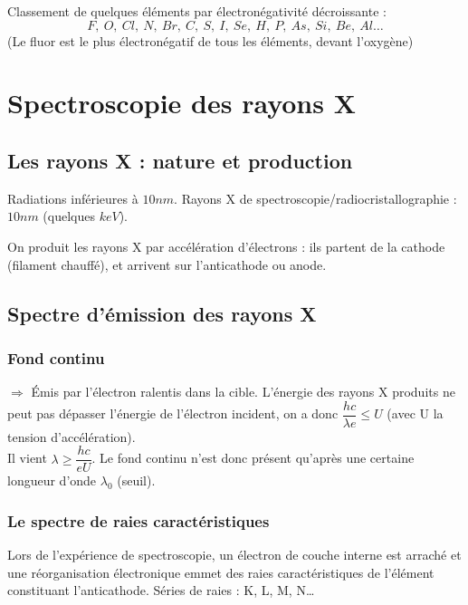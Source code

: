 \documentclass[13pt, twoside, a4paper, french, tikz]{report}
\begin{document}
    Classement de quelques éléments par électronégativité décroissante :
    \[F,\ O,\ Cl,\ N,\ Br,\ C,\ S,\ I,\ Se,\ H,\ P,\ As,\ Si,\ Be,\ Al\ldots\]
    (Le fluor est le plus électronégatif de tous les éléments, devant l'oxygène)


    \chapter{Spectroscopie des rayons X}\label{ch:spectroscopie-des-rayons-x}


    \section{Les rayons X : nature et production}\label{sec:les-rayons-x-:-nature-et-production}

    Radiations inférieures à $10 nm$. Rayons X de spectroscopie/radiocristallographie : $10 nm$ (quelques $keV$).

    On produit les rayons X par accélération d'électrons : ils partent de la cathode (filament chauffé), et arrivent sur l'anticathode ou anode.


    \section{Spectre d'émission des rayons X}\label{sec:spectre-d'emission-des-rayons-x}

    \subsection{Fond continu}\label{subsec:fond-continu}

    $\Rightarrow$ Émis par l'électron ralentis dans la cible.
    L'énergie des rayons X produits ne peut pas dépasser l'énergie de l'électron incident, on a donc $\dfrac{hc}{\lambda e} \le U$ (avec U la tension d'accélération).\\
    Il vient $\lambda \ge \dfrac{hc}{eU}$.
    Le fond continu n'est donc présent qu'après une certaine longueur d'onde $\lambda_{0}$ (seuil).

    \subsection{Le spectre de raies caractéristiques}\label{subsec:le-spectre-de-raies-caracteristiques}

    Lors de l'expérience de spectroscopie, un électron de couche interne est arraché et une réorganisation électronique emmet des raies caractéristiques de l'élément constituant l'anticathode.
    Séries de raies : K, L, M, N\ldots\\
\end{document}
